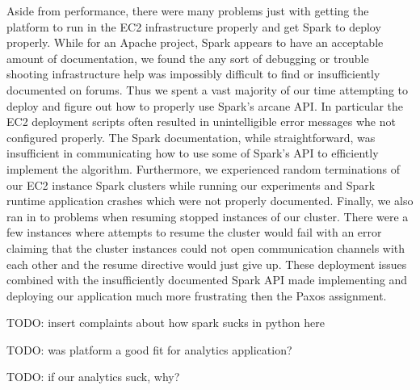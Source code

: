 \documentclass{article}
\begin{document}
Aside from performance, there were many problems just with getting the platform to run in the EC2 infrastructure properly and get Spark to deploy properly.
While for an Apache project, Spark appears to have an acceptable amount of documentation, we found the any sort of debugging or trouble shooting infrastructure help was impossibly difficult to find or insufficiently documented on forums.
Thus we spent a vast majority of our time attempting to deploy and figure out how to properly use Spark's arcane API.
In particular the EC2 deployment scripts often resulted in unintelligible error messages whe not configured properly.
The Spark documentation, while straightforward, was insufficient in communicating how to use some of Spark's API to efficiently implement the algorithm.
Furthermore, we experienced random terminations of our EC2 instance Spark clusters while running our experiments and Spark runtime application crashes which were not properly documented.
Finally, we also ran in to problems when resuming stopped instances of our cluster.
There were a few instances where attempts to resume the cluster would fail with an error claiming that the cluster instances could not open communication channels with each other and the resume directive would just give up.
These deployment issues combined with the insufficiently documented Spark API made implementing and deploying our application much more frustrating then the Paxos assignment.

TODO: insert complaints about how spark sucks in python here


TODO: was platform a good fit for analytics application?

TODO: if our analytics suck, why?
\end{document}
